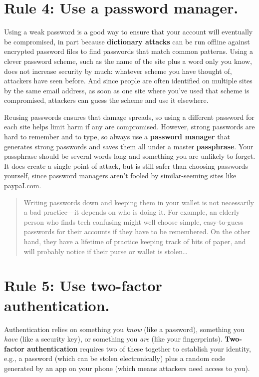 \documentclass[10pt,letterpaper]{article}
\begin{document}
\section*{Rule 4: Use a password manager.}

Using a weak password is a good way to ensure that your account will eventually
be compromised, in part because \textbf{dictionary attacks} can be run offline
against encrypted password files to find passwords that match common
patterns. Using a clever password scheme, such as the name of the site plus a
word only you know, does not increase security by much: whatever scheme you have
thought of, attackers have seen before. And since people are often identified on
multiple sites by the same email address, as soon as one site where you've used
that scheme is compromised, attackers can guess the scheme and use it elsewhere.

Reusing passwords ensures that damage spreads, so using a different password for
each site helps limit harm if any are compromised. However, strong passwords are
hard to remember and to type, so always use a \textbf{password manager} that
generates strong passwords and saves them all under a master \textbf{passphrase}.
Your passphrase should be several words long and something you are unlikely to
forget. It does create a single point of attack, but is still safer than
choosing passwords yourself, since password managers aren't fooled by
similar-seeming sites like paypaI.com.

\begin{quote}
  Writing passwords down and keeping them in your wallet is not necessarily a
  bad practice---it depends on who is doing it. For example, an elderly person
  who finds tech confusing might well choose simple, easy-to-guess passwords for
  their accounts if they have to be remembered. On the other hand, they have a
  lifetime of practice keeping track of bits of paper, and will probably notice
  if their purse or wallet is stolen\ldots{}
\end{quote}

\section*{Rule 5: Use two-factor authentication.}

Authentication relies on something you \emph{know} (like a password), something
you \emph{have} (like a security key), or something you \emph{are} (like your
fingerprints). \textbf{Two-factor authentication} requires two of these together
to establish your identity, e.g., a password (which can be stolen
electronically) plus a random code generated by an app on your phone (which
means attackers need access to you).
\end{document}
